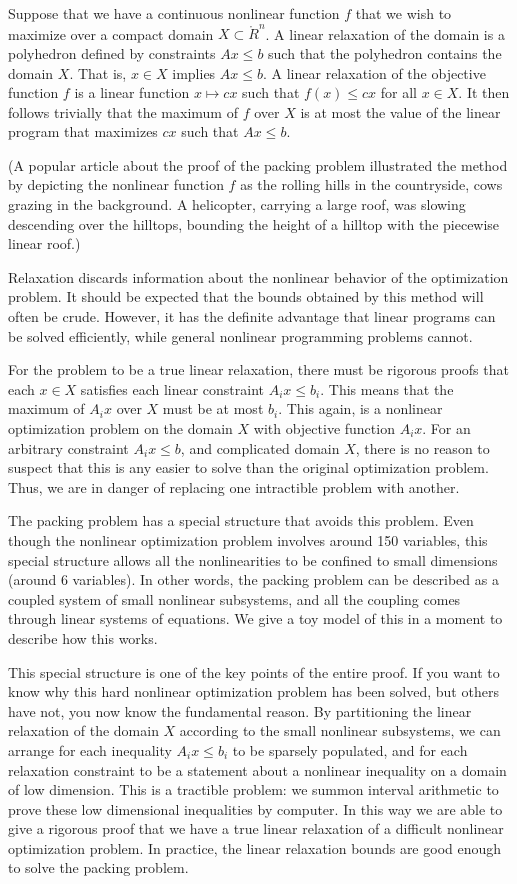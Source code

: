 Suppose that we have a continuous
nonlinear function $f$ that we wish to maximize
over a compact domain $X\subset \ring{R}^n$.    A linear relaxation
of the domain is a polyhedron defined by constraints $A x \le b$
such that the polyhedron contains the domain $X$.  That is,
$x\in X$ implies $A x \le b$.    A linear relaxation of the objective
function $f$ is a linear function $x\mapsto c x$ such that
$f(x) \le c x$ for all $x\in X$.  It then follows trivially
that the maximum of $f$ over $X$ is at most the value of 
the linear program that maximizes $c x$ such that $A x \le b$.

(A popular article about the proof of the packing problem
illustrated the method by depicting the nonlinear function $f$
as the rolling hills in the countryside, cows grazing in the background.  
A helicopter,
carrying a large roof, was slowing
descending over the hilltops, bounding the height of a hilltop
with the piecewise linear roof.)

Relaxation discards information about the nonlinear behavior of the
optimization problem.  It should be expected that the bounds
obtained by this method will often be crude.  However, it has the
definite advantage that linear programs can be solved efficiently,
while general nonlinear programming problems cannot.

For the problem to be a true linear relaxation, there must be
rigorous proofs that each $x\in X$ satisfies each linear
constraint $A_i x\le b_i$.
This means that the maximum of $A_i x$ over $X$ must be at most $b_i$.
This again, is a nonlinear optimization problem on the domain $X$
with objective function $A_i x$.  For an arbitrary constraint $A_i x\le b$,
and complicated domain $X$, there is no reason to suspect that this
is any easier to solve than the original optimization problem.  Thus,
we are in danger of replacing one intractible problem with another.

The packing problem has a special structure that avoids this
problem.  Even though the nonlinear optimization problem involves
around 150 variables, 
this special structure allows all the nonlinearities to 
be confined to small dimensions (around 6 variables).  In other words,
the packing problem can be
described as a coupled system of small nonlinear subsystems,
and all the coupling comes through linear systems of equations. 
We give a toy model of this in a moment to describe how this works.

This special structure is one of the key points of the entire proof.
If you want to know why this hard nonlinear optimization problem has
been solved, but others have not, you now know the fundamental reason.
By partitioning the linear relaxation of the domain $X$ according
to the small nonlinear subsystems, we can arrange for each inequality
$A_i x\le b_i$ to be sparsely populated, and for each relaxation
constraint to be a statement about a nonlinear inequality on a domain
of low dimension.  This is a tractible problem:
we  summon interval arithmetic to prove these
low dimensional inequalities by computer.  In this way we are able
to give a rigorous proof that we have a true linear relaxation of a
difficult nonlinear optimization problem.  In practice, the linear
relaxation  bounds  are good enough to solve the packing
problem.

